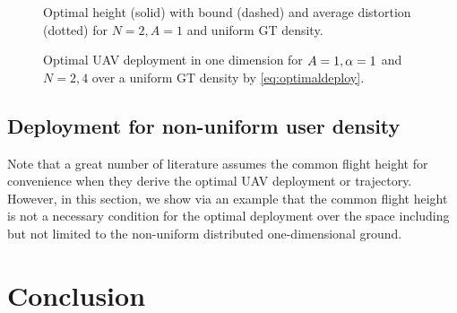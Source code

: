 \documentclass[smallabstract,smallcaptions]{dccpaper}
\newcounter{example}[section]
\newcommand{\junstart}{\color{black}}
\begin{document}
% 
\begin{figure}
\begin{minipage}[b]{0.4\textwidth}
  \vspace{1ex}
\def\svgwidth{1.1\textwidth} \scriptsize{
  }
  \vspace{-3.2ex}
  \caption{Optimal height (solid) with bound (dashed) and average distortion (dotted) for $N=2,A=1$ and uniform GT density.}
  \label{fig:goptdopt}
\end{minipage}
\hfill
  \begin{minipage}[b]{0.56\textwidth}
\hspace{-2ex} 
    \def\svgwidth{1.1\textwidth} \scriptsize{
      }
      \caption{Optimal UAV deployment in one dimension for $A=1,\alpha=1$ and $N=2,4$ over a uniform GT density
      by \eqref{eq:optimaldeploy}.}
      \label{fig:uavonedim}
    \end{minipage}
\end{figure}
%


\junstart
\subsection{Deployment for non-uniform user density}
%
Note that a great number of literature assumes the common flight height for convenience when they derive the optimal UAV
deployment or trajectory.  However, in this section, we show via an example that the common flight height is not a
necessary condition for the optimal deployment over the space including but not limited to the non-uniform distributed
one-dimensional ground.





\section{Conclusion}
\end{document}
